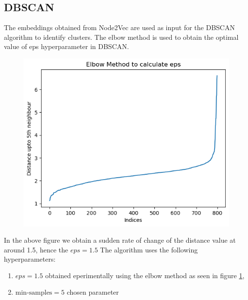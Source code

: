 \documentclass[12pt,a4paper]{article}
\begin{document}
\subsection{DBSCAN}
    The embeddings obtained from Node2Vec are used as input for the DBSCAN algorithm to identify clusters. The elbow method is used to obtain the optimal value of eps hyperparameter in DBSCAN. 
    \begin{figure}[H]
    \centering
    \label{fig:eps}
    \includegraphics[width=12cm]{EPS.png}
    \end{figure}
    In the above figure we obtain a sudden rate of change of the distance value at around 1.5, hence the $eps=1.5$ 
    The algorithm uses the following hyperparameters: 
    \begin{enumerate}
    \item $eps = 1.5$ obtained eperimentally using the elbow method as seen in figure \ref{fig:eps}, 
    \item $\text{min-samples} = 5 $ chosen parameter
\end{enumerate}
\end{document}
